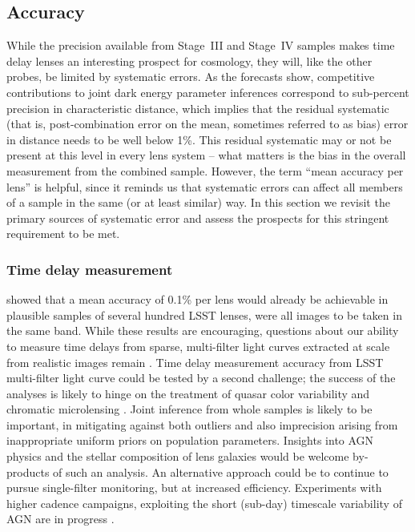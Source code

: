 \subsection{Accuracy}
\label{ssec:accuracy}

While the precision available from Stage~III and Stage~IV samples makes
time delay lenses an interesting prospect for cosmology, they will,
like the other probes, be limited by systematic errors. As the
forecasts show, competitive contributions to joint dark energy
parameter inferences correspond to sub-percent precision in
characteristic distance, which implies that the residual systematic
(that is, post-combination error on the mean, sometimes referred to as
bias) error in distance needs to be well below 1\%. This residual
systematic may or not be present at this level in every lens system --
what matters is the bias in the overall measurement from the combined
sample. However, the term ``mean accuracy per lens'' is helpful, since
it reminds us that systematic errors can affect all members of a sample
in the same (or at least similar) way.  In
this section we revisit the primary sources of systematic error and
assess the prospects for this stringent requirement to be met.

\subsubsection{Time delay measurement}

\citet{LiaoEtal2015} showed that a
mean accuracy of 0.1\% per lens would already be achievable in
plausible samples of several hundred LSST lenses, were all images to
be taken in the same band.  While these results are encouraging,
questions about our ability to measure time delays from sparse,
multi-filter light curves extracted at scale from realistic images
remain \citep{TCM13}.  Time delay measurement accuracy from LSST
multi-filter light curve could be tested by a second challenge; the
success of the analyses is likely to hinge on the treatment of quasar
color variability \citep[see e.g.\ ][and references
therein]{Sch++12,SunEtal2014} and chromatic microlensing
\citep[see e.g.][and references therein]{HainlineEtal2013}.
Joint inference from whole samples is likely to
be important, in mitigating against both outliers and also imprecision
arising from inappropriate uniform priors on  population parameters.
Insights into AGN physics and the stellar composition  of lens galaxies
would be welcome by-products of such an analysis. An alternative approach
could be to continue to pursue single-filter monitoring, but at
increased efficiency. Experiments with higher cadence campaigns,
exploiting the short (sub-day) timescale variability of AGN are in
progress \citep[][F.~Courbin, priv.\ comm.]{BorosonEtal2016}.

